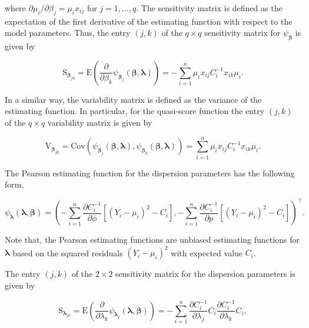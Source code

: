 \documentclass[9pt,a5paper,]{book}
\theoremstyle{definition}
\theoremstyle{definition}
\theoremstyle{remark}
\begin{document}
where \(\partial \mu_i/\partial \beta_j = \mu_i x_{ij}\) for
\(j = 1, \ldots, q\). The sensitivity matrix is defined as the
expectation of the first derivative of the estimating function with
respect to the model parameters. Thus, the entry \((j,k)\) of the
\(q \times q\) sensitivity matrix for \(\psi_{\boldsymbol{\beta}}\) is
given by

\begin{equation}
\mathrm{S}_{\boldsymbol{\beta}_{jk}} = \mathrm{E}\left ( \frac{\partial}{\partial \beta_k} \psi_{\boldsymbol{\beta}_j}(\boldsymbol{\beta}, \boldsymbol{\lambda})  \right ) = -\sum_{i=1}^n \mu_i x_{ij} C^{-1}_i x_{ik} \mu_i.
\label{eq:Sbeta}
\end{equation}

In a similar way, the variability matrix is defined as the variance of
the estimating function. In particular, for the quasi-score function the
entry \((j,k)\) of the \(q \times q\) variability matrix is given by

\begin{equation*}
\label{Vbeta}
\mathrm{V}_{\boldsymbol{\beta}_{jk}} = \mathrm{Cov}(\psi_{\boldsymbol{\beta}_j}(\boldsymbol{\beta}, \boldsymbol{\lambda}),\psi_{\boldsymbol{\beta}_k}(\boldsymbol{\beta}, \boldsymbol{\lambda})) = \sum_{i=1}^n \mu_i x_{ij} C^{-1}_i x_{ik} \mu_i.
\end{equation*}

The Pearson estimating function for the dispersion parameters has the
following form,

\begin{equation*}
\label{Pearson}
\psi_{\boldsymbol{\lambda}}(\boldsymbol{\lambda}, \boldsymbol{\beta}) = \left (-\sum_{i=1}^n \frac{\partial C^{-1}_i}{\partial \phi} \left [ (Y_i - \mu_i)^2 - C_i \right ], -\sum_{i=1}^n \frac{\partial C^{-1}_i}{\partial p}  \left [ (Y_i - \mu_i)^2 - C_i \right ]  \right )^\top.
\end{equation*}

Note that, the Pearson estimating functions are unbiased estimating
functions for \(\boldsymbol{\lambda}\) based on the squared residuals
\((Y_i - \mu_i)^2\) with expected value \(C_i\).

The entry \((j,k)\) of the \(2 \times 2\) sensitivity matrix for the
dispersion parameters is given by

\begin{equation}
\mathrm{S}_{\boldsymbol{\lambda}_{jk}} = \mathrm{E}\left ( \frac{\partial}{\partial \lambda_k}\psi_{\boldsymbol{\lambda}_j}(\boldsymbol{\lambda}, \boldsymbol{\beta})  \right ) = -\sum_{i=1}^n \frac{\partial C^{-1}_i}{\partial \lambda_j} C_i \frac{\partial C^{-1}_i}{\partial \lambda_k}C_i,
\label{eq:Slambda}
\end{equation}
\end{document}
